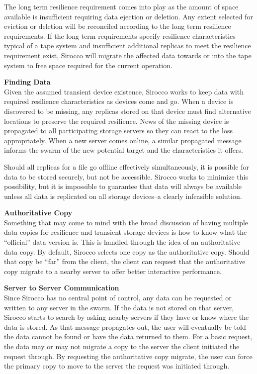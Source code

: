 The long term resilience requirement comes into play as the amount of space
available is insufficient requiring data ejection or deletion. Any extent
selected for eviction or deletion will be reconciled according to the long term
resilience requirements. If the long term requirements specify resilience
characteristics typical of a tape system and insufficient additional replicas
to meet the resilience requirement exist, Sirocco will migrate the affected
data towards or into the tape system to free space required for the current
operation.

\noindent\textbf{Finding Data}\\
Given the assumed transient device existence, Sirocco works to keep data with
required resilience characteristics as devices come and go. When a device is
discovered to be missing, any replicas stored on that device must find
alternative locations to preserve the required resilience. News of the missing
device is propagated to all participating storage servers so they can react to
the loss appropriately. When a new server comes online, a similar propagated
message informs the swarm of the new potential target and the characteristics
it offers.

Should all replicas for a file go offline effectively simultaneously, it is
possible for data to be stored securely, but not be accessible. Sirocco works
to minimize this possibility, but it is impossible to guarantee that data will
always be available unless all data is replicated on all storage devices--a
clearly infeasible solution.

\noindent\textbf{Authoritative Copy}\\
Something that may come to mind with the broad discussion of having multiple
data copies for resilience and transient storage devices is how to know what
the ``official'' data version is. This is handled through the idea of an
authoritative data copy. By default, Sirocco selects one copy as the
authoritative copy. Should that copy be ``far'' from the client, the client can
request that the authoritative copy migrate to a nearby server to offer better
interactive performance.

\noindent\textbf{Server to Server Communication}\\
Since Sirocco has no central point of control, any data can be requested or
written to any server in the swarm. If the data is not stored on that server,
Sirocco starts to search by asking nearby servers if they have or know where
the data is stored. As that message propagates out, the user will eventually be
told the data cannot be found or have the data returned to them. For a basic
request, the data may or may not migrate a copy to the server the client
initiated the request through. By requesting the authoritative copy migrate,
the user can force the primary copy to move to the server the request was
initiated through.

